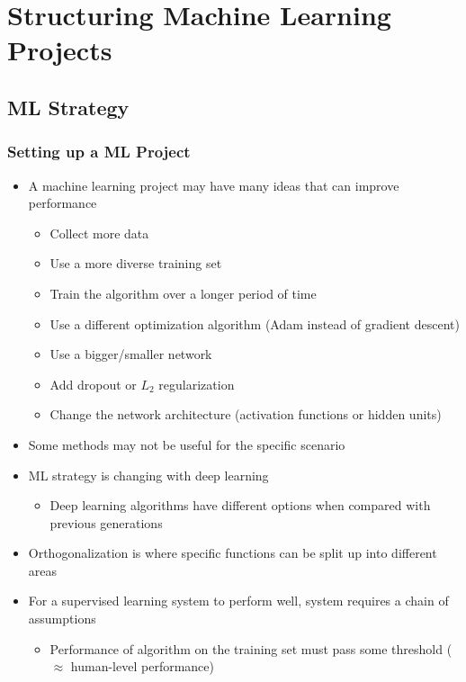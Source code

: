 \documentclass[12pt, letterpaper]{article}
\begin{document}
    \section{Structuring Machine Learning Projects}
    \subsection{ML Strategy} 
    \subsubsection{Setting up a ML Project}
    \begin{itemize}
        \item A machine learning project may have many ideas that can improve performance
        \begin{itemize}
            \item Collect more data
            \item Use a more diverse training set
            \item Train the algorithm over a longer period of time
            \item Use a different optimization algorithm (Adam instead of gradient descent)
            \item Use a bigger/smaller network
            \item Add dropout or $L_2$ regularization
            \item Change the network architecture (activation functions or hidden units)
        \end{itemize}
        \item Some methods may not be useful for the specific scenario
        \item ML strategy is changing with deep learning
        \begin{itemize}
            \item Deep learning algorithms have different options when compared with previous generations
        \end{itemize} 
        \item Orthogonalization is where specific functions can be split up into different areas 
        \item For a supervised learning system to perform well, system requires a chain of assumptions
        \begin{itemize}
            \item Performance of algorithm on the training set must pass some threshold ($\approx$ human-level performance)

\end{itemize}
\end{itemize}
\end{document}
